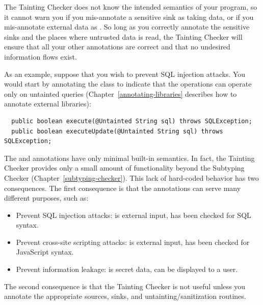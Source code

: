 The Tainting Checker does not know the intended semantics of your program,
so it cannot warn you if you mis-annotate a sensitive sink as taking
 data, or if you mis-annotate external data as
.  So long as you correctly annotate the sensitive sinks
and the places where untrusted data is read, the Tainting Checker will
ensure that all your other annotations are correct and that no undesired
information flows exist.

As an example, suppose that you wish to prevent SQL injection attacks.  You
would start by annotating the
 class to indicate that the
 operations can operate only on untainted queries
(Chapter~\ref{annotating-libraries} describes how to annotate external
libraries):

\begin{Verbatim}
  public boolean execute(@Untainted String sql) throws SQLException;
  public boolean executeUpdate(@Untainted String sql) throws SQLException;
\end{Verbatim}



The  and  annotations have only minimal
built-in semantics.  In fact, the Tainting Checker provides only a small
amount of functionality beyond the Subtyping Checker
(Chapter~\ref{subtyping-checker}).  This lack of hard-coded behavior has
two consequences.  The first consequence is that
the annotations can serve many different purposes, such as:

\begin{itemize}
\item
  Prevent SQL injection attacks:   is external input,
   has been checked for SQL syntax.
\item
  Prevent cross-site scripting attacks:   is external input,
   has been checked for JavaScript syntax.
\item
  Prevent information leakage:   is secret data,
   can be displayed to a user.
\end{itemize}

The second consequence is that the Tainting Checker is not useful unless
you annotate the appropriate sources, sinks, and untainting/sanitization
routines.


